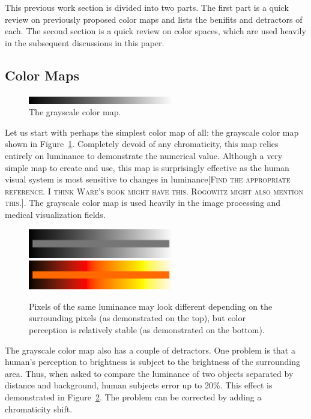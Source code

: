 \documentclass[twocolumn]{article}
\newcommand{\sticky}[1]{\textsc{[#1]}}
\begin{document}
This previous work section is divided into two parts.  The first part is a
quick review on previously proposed color maps and lists the benifits and
detractors of each.  The second section is a quick review on color spaces,
which are used heavily in the subsequent discussions in this paper.

\subsection{Color Maps}
\label{sec:PreviousWork:ColorMaps}

\begin{figure}
  \centering
  \includegraphics[width=2.5in]{images/GrayscaleBar}
  \caption{The grayscale color map.}
  \label{fig:GrayscaleColorMap}
\end{figure}

Let us start with perhaps the simplest color map of all: the grayscale
color map shown in Figure~\ref{fig:GrayscaleColorMap}.  Completely devoid
of any chromaticity, this map relies entirely on luminance to demonstrate
the numerical value.  Although a very simple map to create and use, this
map is surprisingly effective as the human visual system is most sensitive
to changes in luminance\sticky{Find the appropriate reference.  I think
  Ware's book might have this.  Rogowitz might also mention this.}.  The
grayscale color map is used heavily in the image processing and medical
visualization fields.

\begin{figure}
  \centering
  \includegraphics[width=2.5in]{images/GrayscaleLocality}
  \includegraphics[width=2.5in]{images/BlackBodyLocality}
  \caption{Pixels of the same luminance may look different depending on the
    surrounding pixels (as demonstrated on the top), but color perception
    is relatively stable (as demonstrated on the bottom).}
  \label{fig:GrayscaleLocality}
\end{figure}
The grayscale color map also has a couple of detractors.  One problem is
that a human's perception to brightness is subject to the brightness of the
surrounding area.  Thus, when asked to compare the luminance of two objects
separated by distance and background, human subjects error up to 20\%.
This effect is demonstrated in Figure~\ref{fig:GrayscaleLocality}.  The
problem can be corrected by adding a chromaticity shift.
\end{document}
